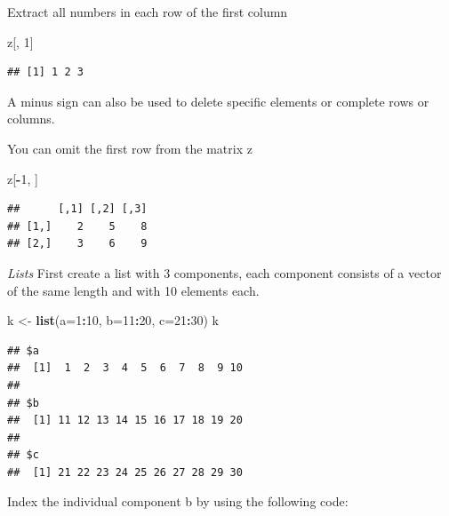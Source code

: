\documentclass[]{book}
\newenvironment{Shaded}{\begin{snugshade}}{\end{snugshade}}
\newcommand{\KeywordTok}[1]{\textcolor[rgb]{0.13,0.29,0.53}{\textbf{#1}}}
\newcommand{\DataTypeTok}[1]{\textcolor[rgb]{0.13,0.29,0.53}{#1}}
\newcommand{\DecValTok}[1]{\textcolor[rgb]{0.00,0.00,0.81}{#1}}
\newcommand{\StringTok}[1]{\textcolor[rgb]{0.31,0.60,0.02}{#1}}
\newcommand{\OperatorTok}[1]{\textcolor[rgb]{0.81,0.36,0.00}{\textbf{#1}}}
\newcommand{\NormalTok}[1]{#1}
\theoremstyle{definition}
\theoremstyle{definition}
\theoremstyle{definition}
\theoremstyle{remark}
\begin{document}
Extract all numbers in each row of the first column

\begin{Shaded}
\begin{Highlighting}[]
\NormalTok{z[, }\DecValTok{1}\NormalTok{]}
\end{Highlighting}
\end{Shaded}

\begin{verbatim}
## [1] 1 2 3
\end{verbatim}

A minus sign can also be used to delete specific elements or complete
rows or columns.

You can omit the first row from the matrix z

\begin{Shaded}
\begin{Highlighting}[]
\NormalTok{z[}\OperatorTok{-}\DecValTok{1}\NormalTok{, ]}
\end{Highlighting}
\end{Shaded}

\begin{verbatim}
##      [,1] [,2] [,3]
## [1,]    2    5    8
## [2,]    3    6    9
\end{verbatim}

\emph{Lists} First create a list with 3 components, each component
consists of a vector of the same length and with 10 elements each.

\begin{Shaded}
\begin{Highlighting}[]
\NormalTok{k <-}\StringTok{ }\KeywordTok{list}\NormalTok{(}\DataTypeTok{a=}\DecValTok{1}\OperatorTok{:}\DecValTok{10}\NormalTok{, }\DataTypeTok{b=}\DecValTok{11}\OperatorTok{:}\DecValTok{20}\NormalTok{, }\DataTypeTok{c=}\DecValTok{21}\OperatorTok{:}\DecValTok{30}\NormalTok{)}
\NormalTok{k}
\end{Highlighting}
\end{Shaded}

\begin{verbatim}
## $a
##  [1]  1  2  3  4  5  6  7  8  9 10
## 
## $b
##  [1] 11 12 13 14 15 16 17 18 19 20
## 
## $c
##  [1] 21 22 23 24 25 26 27 28 29 30
\end{verbatim}

Index the individual component b by using the following code:

\begin{Shaded}
\end{Shaded}
\end{document}
